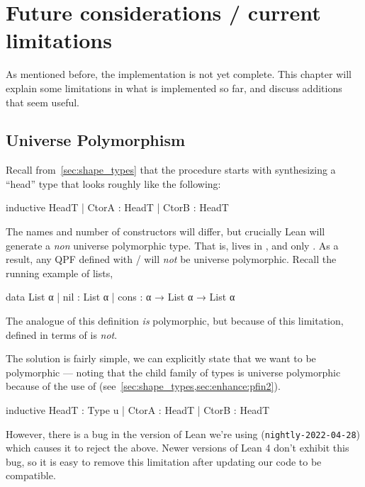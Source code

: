 
\chapter{Future considerations / current limitations}%
\label{ch:limitations}


As mentioned before, the implementation is not yet complete.
This chapter will explain some limitations in what is implemented so far, and discuss
additions that seem useful.

\section{Universe Polymorphism}

Recall from~\cref{sec:shape_types} that the procedure starts with synthesizing a ``head'' type that
looks roughly like the following:
\begin{leancode}
  inductive HeadT
    | CtorA : HeadT
    | CtorB : HeadT
\end{leancode}
The names and number of constructors will differ, but crucially Lean will generate a \emph{non} universe 
polymorphic type. That is,  lives in , and only .
As a result, any QPF defined with \data{}/\codata{} will \emph{not} be universe polymorphic.
Recall the running example of lists,
\begin{leancode}
  data List α 
    | nil  : List α
    | cons : α → List α → List α
\end{leancode}

The \inductive{} analogue of this definition \emph{is} polymorphic, but because of this limitation,
 defined in terms of \data{} is \emph{not}.
  

The solution is fairly simple, we can explicitly state that we want  to be polymorphic
--- noting that the child family of types is universe polymorphic because of the use of  (see~\cref{sec:shape_types,sec:enhance:pfin2}).
\begin{badleancode}

  inductive HeadT : Type u
    | CtorA : HeadT
    | CtorB : HeadT

\end{badleancode}

However, there is a bug in the version of Lean we're using (\texttt{nightly-2022-04-28}) 
which causes it to reject the above. 
Newer versions of Lean 4 don't exhibit this bug, so it is easy to remove this limitation after updating
our code to be compatible.



